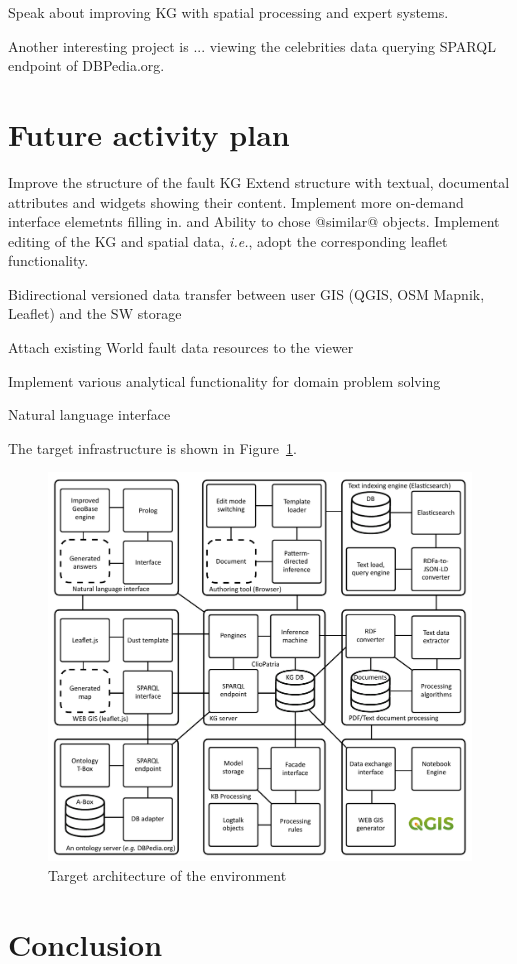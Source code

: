 \documentclass[
]{ceurart}
\begin{document}
  Speak about improving KG with spatial processing and expert systems.

  Another interesting project is ... viewing the celebrities data querying SPARQL endpoint of DBPedia.org.

\section{Future activity plan}

Improve the structure of the fault KG
Extend structure with textual, documental attributes and widgets showing their content.
Implement more on-demand interface elemetnts filling in. and Ability to chose @similar@ objects.
Implement editing of the KG and spatial data, \emph{i.e.}, adopt the corresponding leaflet functionality.

 Bidirectional versioned data transfer between user GIS (QGIS, OSM Mapnik, Leaflet) and the SW storage

Attach existing World fault data resources to the viewer

   Implement various analytical functionality for domain problem solving

   Natural language interface


The target infrastructure is shown in Figure~\ref{fig:target}.
\begin{figure}
  \centering
  \includegraphics[width=0.8\linewidth]{architecture.pdf}
  \caption{Target architecture of the environment}
  \label{fig:target}
\end{figure}


\section*{Conclusion}
\end{document}
